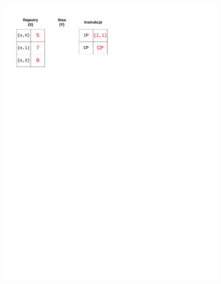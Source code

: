 \begin{figure}
\begin{multicols}{2}

\vspace{-4mm}
\begin{Figure}
 \centering
 \includegraphics[scale=0.65, clip, trim=10mm 215mm 110mm 10mm]{interpreter_max_1}
\label{fig:max1}
\end{Figure}


\end{multicols}
\end{figure}
